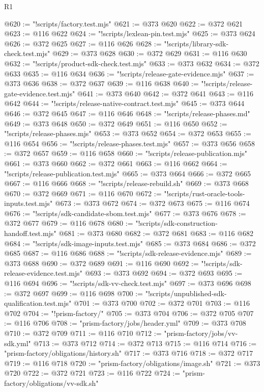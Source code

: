 \begin{lexlean}{R1}
\begin{coremodule}
@620 := "!scripts/factory.test.mjs"
@621 := @373 @620
@622 := @372 @621
@623 := @116 @622
@624 := "!scripts/lexlean-pin.test.mjs"
@625 := @373 @624
@626 := @372 @625
@627 := @116 @626
@628 := "!scripts/library-sdk-check.test.mjs"
@629 := @373 @628
@630 := @372 @629
@631 := @116 @630
@632 := "!scripts/product-sdk-check.test.mjs"
@633 := @373 @632
@634 := @372 @633
@635 := @116 @634
@636 := "!scripts/release-gate-evidence.mjs"
@637 := @373 @636
@638 := @372 @637
@639 := @116 @638
@640 := "!scripts/release-gate-evidence.test.mjs"
@641 := @373 @640
@642 := @372 @641
@643 := @116 @642
@644 := "!scripts/release-native-contract.test.mjs"
@645 := @373 @644
@646 := @372 @645
@647 := @116 @646
@648 := "!scripts/release-phases.md"
@649 := @373 @648
@650 := @372 @649
@651 := @116 @650
@652 := "!scripts/release-phases.mjs"
@653 := @373 @652
@654 := @372 @653
@655 := @116 @654
@656 := "!scripts/release-phases.test.mjs"
@657 := @373 @656
@658 := @372 @657
@659 := @116 @658
@660 := "!scripts/release-publication.mjs"
@661 := @373 @660
@662 := @372 @661
@663 := @116 @662
@664 := "!scripts/release-publication.test.mjs"
@665 := @373 @664
@666 := @372 @665
@667 := @116 @666
@668 := "!scripts/release-rebuild.sh"
@669 := @373 @668
@670 := @372 @669
@671 := @116 @670
@672 := "!scripts/rust-oracle-tools-inputs.test.mjs"
@673 := @373 @672
@674 := @372 @673
@675 := @116 @674
@676 := "!scripts/sdk-candidate-sbom.test.mjs"
@677 := @373 @676
@678 := @372 @677
@679 := @116 @678
@680 := "!scripts/sdk-construction-handoff.test.mjs"
@681 := @373 @680
@682 := @372 @681
@683 := @116 @682
@684 := "!scripts/sdk-image-inputs.test.mjs"
@685 := @373 @684
@686 := @372 @685
@687 := @116 @686
@688 := "!scripts/sdk-release-evidence.mjs"
@689 := @373 @688
@690 := @372 @689
@691 := @116 @690
@692 := "!scripts/sdk-release-evidence.test.mjs"
@693 := @373 @692
@694 := @372 @693
@695 := @116 @694
@696 := "!scripts/sdk-vv-check.test.mjs"
@697 := @373 @696
@698 := @372 @697
@699 := @116 @698
@700 := "!scripts/unpublished-sdk-qualification.test.mjs"
@701 := @373 @700
@702 := @372 @701
@703 := @116 @702
@704 := "!prism-factory/"
@705 := @373 @704
@706 := @372 @705
@707 := @116 @706
@708 := "prism-factory/jobs/header.yml"
@709 := @373 @708
@710 := @372 @709
@711 := @116 @710
@712 := "prism-factory/jobs/vv-sdk.yml"
@713 := @373 @712
@714 := @372 @713
@715 := @116 @714
@716 := "prism-factory/obligations/history.sh"
@717 := @373 @716
@718 := @372 @717
@719 := @116 @718
@720 := "prism-factory/obligations/image.sh"
@721 := @373 @720
@722 := @372 @721
@723 := @116 @722
@724 := "prism-factory/obligations/vv-sdk.sh"

\end{coremodule}
\end{lexlean}

